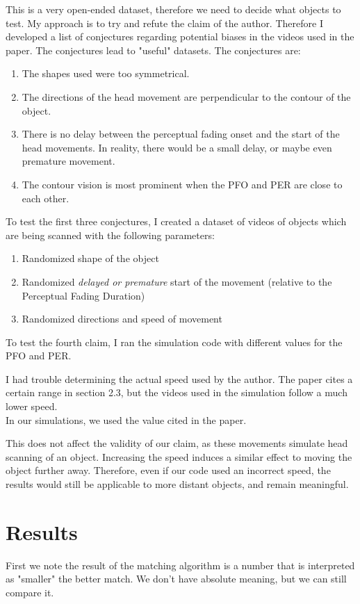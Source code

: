 \documentclass[]{article}
\begin{document}
This is a very open-ended dataset, therefore we need to decide what objects to test. My approach is to try and refute the claim of the author. Therefore I developed a list of conjectures regarding potential biases in the videos used in the paper. The conjectures lead to "useful" datasets. 
The conjectures are:
\begin{enumerate}
	\item The shapes used were too symmetrical.
	\item The directions of the head movement are perpendicular to the contour of the object.
	\item There is no delay between the perceptual fading onset and the start of the head movements. In reality, there would be a small delay, or maybe even premature movement.
	
	\item The contour vision is most prominent when the PFO and PER are close to each other.

\end{enumerate}
To test the first three conjectures, I created a dataset of videos of objects which are being scanned with the following parameters:
\begin{enumerate}
	\item Randomized shape of the object
	\item Randomized {\it delayed or premature} start of the movement (relative to the Perceptual Fading Duration)
	\item Randomized directions and speed of movement
\end{enumerate}
To test the fourth claim, I ran the simulation code with different values for the PFO and PER.

\begin{remark}
	I had trouble determining the actual speed used by the author. The paper cites a certain range in section 2.3, but the videos used in the simulation follow a much lower speed. \\
	In our simulations, we used the value cited in the paper.
	
	This does not affect the validity of our claim, as these movements simulate head scanning of an object. Increasing the speed induces a similar effect to moving the object further away. Therefore, even if our code used an incorrect speed, the results would still be applicable to more distant objects, and remain meaningful.
\end{remark}

\section{Results}
First we note the result of the matching algorithm is a number that is interpreted as "smaller" the better match. We don't have absolute meaning, but we can still compare it.
\end{document}
